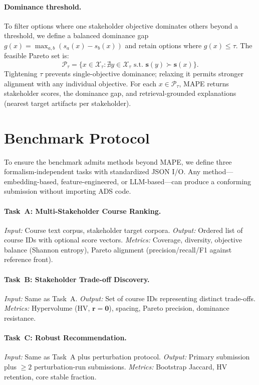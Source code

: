 \documentclass[sigconf,review]{acmart}
\newcommand{\MAPE}{\textsc{MAPE}\xspace}
\begin{document}
\paragraph{Dominance threshold.}
\label{subsec:constraint}
To filter options where one stakeholder objective dominates others beyond a threshold, we define a balanced dominance gap $g(x) = \max_{a,b}(s_a(x) - s_b(x))$ and retain options where $g(x) \le \tau$. The feasible Pareto set is:
\begin{equation}
  \mathcal{P}_\tau = \big\{x\in\mathcal{X}_\tau : \nexists y\in\mathcal{X}_\tau \text{ s.t. } \mathbf{s}(y)\succ \mathbf{s}(x)\big\}.
\end{equation}
Tightening $\tau$ prevents single-objective dominance; relaxing it permits stronger alignment with any individual objective. For each $x\in\mathcal{P}_\tau$, \MAPE returns stakeholder scores, the dominance gap, and retrieval-grounded explanations (nearest target artifacts per stakeholder).


\section{Benchmark Protocol}
\label{sec:benchmark-protocol}

To ensure the benchmark admits methods beyond \MAPE, we define three formalism-independent tasks with standardized JSON I/O. Any method---embedding-based, feature-engineered, or LLM-based---can produce a conforming submission without importing ADS code.

\paragraph{Task~A: Multi-Stakeholder Course Ranking.}
\textit{Input:} Course text corpus, stakeholder target corpora.
\textit{Output:} Ordered list of course IDs with optional score vectors.
\textit{Metrics:} Coverage, diversity, objective balance (Shannon entropy), Pareto alignment (precision/recall/F1 against reference front).

\paragraph{Task~B: Stakeholder Trade-off Discovery.}
\textit{Input:} Same as Task~A.
\textit{Output:} Set of course IDs representing distinct trade-offs.
\textit{Metrics:} Hypervolume (HV, $\mathbf{r}{=}\mathbf{0}$), spacing, Pareto precision, dominance resistance.

\paragraph{Task~C: Robust Recommendation.}
\textit{Input:} Same as Task~A plus perturbation protocol.
\textit{Output:} Primary submission plus ${\geq}2$ perturbation-run submissions.
\textit{Metrics:} Bootstrap Jaccard, HV retention, core stable fraction.
\end{document}
